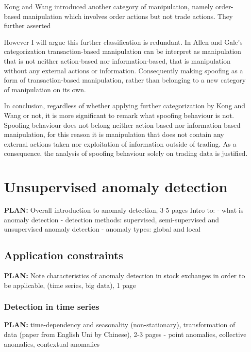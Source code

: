 \documentclass{tut-thesis}
\begin{document}
Kong and Wang \cite*{KongWang2013} introduced another category of manipulation, namely order-based manipulation which involves order actions but not trade actions. They further asserted 

However I will argue this further classification is redundant. In Allen and Gale's categorization transaction-based manipulation can be interpret as manipulation that is not neither action-based nor information-based, that is manipulation without any external actions or information. Consequently making spoofing as a form of transaction-based manipulation, rather than belonging to a new category of manipulation on its own.

In conclusion, regardless of whether applying further categorization by Kong and Wang or not, it is more significant to remark what spoofing behaviour is not. Spoofing behaviour does not belong neither action-based nor information-based manipulation, for this reason it is manipulation that does not contain any external actions taken nor exploitation of information outside of trading. As a consequence, the analysis of spoofing behaviour solely on trading data is justified.



\chapter{Unsupervised anomaly detection}
\textbf{PLAN:} Overall introduction to anomaly detection, 3-5 pages
Intro to:
- what is anomaly detection
- detection methods: supervised, semi-supervised and unsupervised anomaly detection
- anomaly types: global and local

\section{Application constraints}
\textbf{PLAN:} Note characteristics of anomaly detection in stock exchanges in order to be applicable, (time series, big data), 1 page

\subsection{Detection in time series}
\textbf{PLAN:} time-dependency and seasonality (non-stationary), transformation of data (paper from English Uni by Chinese), 2-3 pages
- point anomalies, collective anomalies, contextual anomalies
\end{document}
